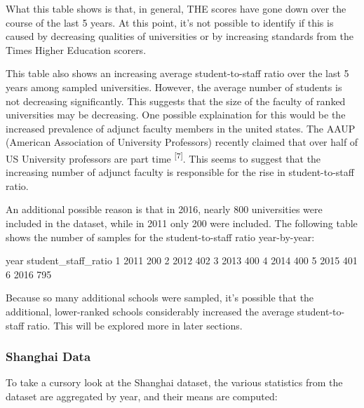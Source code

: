 \documentclass[12pt]{article}
\begin{document}
What this table shows is that, in general, THE scores have gone down over the course of the last 5 years. At this point, it's not possible to identify if this is caused by decreasing qualities of universities or by increasing standards from the Times Higher Education scorers.

This table also shows an increasing average student-to-staff ratio over the last 5 years among sampled universities. However, the average number of students is not decreasing significantly. This suggests that the size of the faculty of ranked universities may be decreasing. One possible explaination for this would be the increased prevalence of adjunct faculty members in the united states. The AAUP (American Association of University Professors) recently claimed that over half of US University professors are part time \textsuperscript{[7]}. This seems to suggest that the increasing number of adjunct faculty is responsible for the rise in student-to-staff ratio.

An additional possible reason is that in 2016, nearly 800 universities were included in the dataset, while in 2011 only 200 were included. 
The following table shows the number of samples for the student-to-staff ratio year-by-year:

\begin{Schunk}
\begin{Soutput}
  year student_staff_ratio
1 2011                 200
2 2012                 402
3 2013                 400
4 2014                 400
5 2015                 401
6 2016                 795
\end{Soutput}
\end{Schunk}

Because so many additional schools were sampled, it's possible that the additional, lower-ranked schools considerably increased the average student-to-staff ratio. This will be explored more in later sections.


\subsubsection{Shanghai Data}
To take a cursory look at the Shanghai dataset, the various statistics from the dataset are aggregated by year, and their means are computed:
\end{document}
